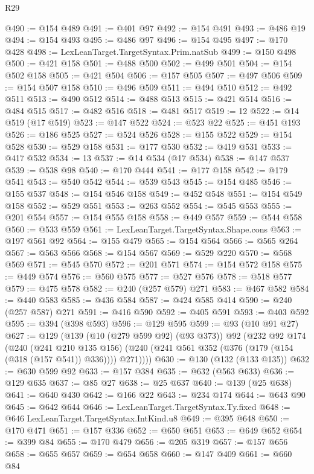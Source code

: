 \begin{lexlean}{R29}
\begin{coremodule}
@490 := @154 @489
@491 := @401 @97
@492 := @154 @491
@493 := @486 @19
@494 := @154 @493
@495 := @486 @97
@496 := @154 @495
@497 := @170 @428
@498 := LexLeanTarget.TargetSyntax.Prim.natSub
@499 := @150 @498
@500 := @421 @158
@501 := @488 @500
@502 := @499 @501
@504 := @154 @502 @158
@505 := @421 @504
@506 := @157 @505
@507 := @497 @506
@509 := @154 @507 @158
@510 := @496 @509
@511 := @494 @510
@512 := @492 @511
@513 := @490 @512
@514 := @488 @513
@515 := @421 @514
@516 := @484 @515
@517 := @482 @516
@518 := @481 @517
@519 := 12
@522 := @14 @519 (@17 @519)
@523 := @147 @522
@524 := @523 @22
@525 := @451 @193
@526 := @186 @525
@527 := @524 @526
@528 := @155 @522
@529 := @154 @528
@530 := @529 @158
@531 := @177 @530
@532 := @419 @531
@533 := @417 @532
@534 := 13
@537 := @14 @534 (@17 @534)
@538 := @147 @537
@539 := @538 @98
@540 := @170 @444
@541 := @177 @158
@542 := @179 @541
@543 := @540 @542
@544 := @539 @543
@545 := @154 @485
@546 := @155 @537
@548 := @154 @546 @158
@549 := @452 @548
@551 := @154 @549 @158
@552 := @529 @551
@553 := @263 @552
@554 := @545 @553
@555 := @201 @554
@557 := @154 @555 @158
@558 := @449 @557
@559 := @544 @558
@560 := @533 @559
@561 := LexLeanTarget.TargetSyntax.Shape.cons
@563 := @197 @561 @92
@564 := @155 @479
@565 := @154 @564
@566 := @565 @264
@567 := @563 @566
@568 := @154 @567
@569 := @529 @220
@570 := @568 @569
@571 := @545 @570
@572 := @201 @571
@574 := @154 @572 @158
@575 := @449 @574
@576 := @560 @575
@577 := @527 @576
@578 := @518 @577
@579 := @475 @578
@582 := @240 (@257 @579) @271
@583 := @467 @582
@584 := @440 @583
@585 := @436 @584
@587 := @424 @585 @414
@590 := @240 (@257 @587) @271
@591 := @416 @590
@592 := @405 @591
@593 := @403 @592
@595 := @394 (@398 @593)
@596 := @129 @595
@599 := @93 (@10 @91 @27)
@627 := @129
    (@139
      (@10 (@279 @599 @92) (@93 @373))
      @92
      (@232
        @92
        @174
        (@240
          (@241 @210 @135 @156)
          (@240 (@241 @561 @352 (@376 (@179 (@154 (@318 (@157 @541)) @336)))) @271))))
@630 := @130 (@132 (@133 @135))
@632 := @630 @599 @92
@633 := @157 @384
@635 := @632 (@563 @633)
@636 := @129 @635
@637 := @85 @27
@638 := @25 @637
@640 := @139 (@25 @638)
@641 := @640 @430
@642 := @166 @22
@643 := @234 @174
@644 := @643 @90
@645 := @642 @644
@646 := LexLeanTarget.TargetSyntax.Ty.fixed
@648 := @646 LexLeanTarget.TargetSyntax.IntKind.u8
@649 := @395 @648
@650 := @170 @471
@651 := @157 @336
@652 := @650 @651
@653 := @649 @652
@654 := @399 @84
@655 := @170 @479
@656 := @205 @319
@657 := @157 @656
@658 := @655 @657
@659 := @654 @658
@660 := @147 @409
@661 := @660 @84

\end{coremodule}
\end{lexlean}
